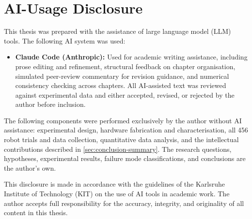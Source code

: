 \documentclass[oneside,studentpaper]{wbk}
\begin{document}
\newpage
\chapter*{AI-Usage Disclosure}

This thesis was prepared with the assistance of large language model (LLM) tools. The following AI system was used:

\begin{itemize}
  \item \textbf{Claude Code (Anthropic):} Used for academic writing assistance, including prose editing and refinement, structural feedback on chapter organisation, simulated peer-review commentary for revision guidance, and numerical consistency checking across chapters. All AI-assisted text was reviewed against experimental data and either accepted, revised, or rejected by the author before inclusion.
\end{itemize}

The following components were performed exclusively by the author without AI assistance: experimental design, hardware fabrication and characterisation, all 456 robot trials and data collection, quantitative data analysis, and the intellectual contributions described in \cref{sec:conclusion-summary}. The research questions, hypotheses, experimental results, failure mode classifications, and conclusions are the author's own.

This disclosure is made in accordance with the guidelines of the Karlsruhe Institute of Technology (KIT) on the use of AI tools in academic work. The author accepts full responsibility for the accuracy, integrity, and originality of all content in this thesis.
\newpage

\end{document}

